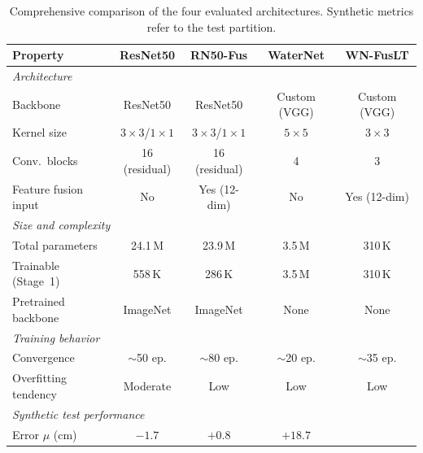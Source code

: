 \begin{table}[htbp]
    \caption{Comprehensive comparison of the four evaluated architectures. Synthetic metrics refer to the test partition.}
    \begin{center}
        \small
        \begin{tabular}{|l|c|c|c|c|}
        \hline
        \textbf{Property}
            & \textbf{ResNet50}
            & \textbf{RN50-Fus}
            & \textbf{WaterNet}
            & \textbf{WN-FusLT} \\
        \hline
        \multicolumn{5}{|l|}{\textit{Architecture}} \\
        \hline
        Backbone
            & ResNet50
            & ResNet50
            & Custom (VGG)
            & Custom (VGG) \\
        Kernel size
            & $3\times3$/$1\times1$
            & $3\times3$/$1\times1$
            & $5\times5$
            & $3\times3$ \\
        Conv.\ blocks
            & 16 (residual)
            & 16 (residual)
            & 4
            & 3 \\
        Feature fusion input
            & No
            & Yes (12-dim)
            & No
            & Yes (12-dim) \\
        \hline
        \multicolumn{5}{|l|}{\textit{Size and complexity}} \\
        \hline
        Total parameters
            & 24.1\,M
            & 23.9\,M
            & 3.5\,M
            & 310\,K \\
        Trainable (Stage~1)
            & 558\,K
            & 286\,K
            & 3.5\,M
            & 310\,K \\
        Pretrained backbone
            & ImageNet
            & ImageNet
            & None
            & None \\
        \hline
        \multicolumn{5}{|l|}{\textit{Training behavior}} \\
        \hline
        Convergence
            & $\sim$50 ep.
            & $\sim$80 ep.
            & $\sim$20 ep.
            & $\sim$35 ep. \\
        Overfitting tendency
            & Moderate
            & Low
            & Low
            & Low \\
        \hline
        \multicolumn{5}{|l|}{\textit{Synthetic test performance}} \\
        \hline
        Error $\mu$ (cm)
            & $-1.7$
            & $+0.8$
            & $+18.7$

\end{tabular}
\end{center}
\end{table}
